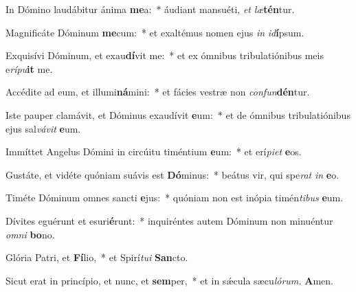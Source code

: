 \item In Dómino laudábitur ánima \textbf{me}a:~* áudiant mansuéti, \textit{et} \textit{læ}\textbf{tén}tur.
\item Magnificáte Dóminum \textbf{me}cum:~* et exaltémus nomen ejus \textit{in} \textit{id}\textbf{í}psum.
\item Exquisívi Dóminum, et exau\textbf{dí}vit me:~* et ex ómnibus tribulatiónibus meis e\textit{rípu}\textbf{it} me.
\item Accédite ad eum, et illumi\textbf{ná}mini:~* et fácies vestræ non \textit{confun}\textbf{dén}tur.
\item Iste pauper clamávit, et Dóminus exaudívit \textbf{e}um:~* et de ómnibus tribulatiónibus ejus sal\textit{vávit} \textbf{e}um.
\item Immíttet Angelus Dómini in circúitu timéntium \textbf{e}um:~* et erí\tinyhspace\textit{piet} \textbf{e}os.
\item Gustáte, et vidéte quóniam suávis est \textbf{Dó}minus:~* beátus vir, qui spe\textit{rat} \textit{in} \textbf{e}o.
\item Timéte Dóminum omnes sancti \textbf{e}jus:~* quóniam non est inópia timén\textit{tibus} \textbf{e}um.
\item Dívites eguérunt et esuri\textbf{é}runt:~* inquiréntes autem Dóminum non minuéntur \textit{omni} \textbf{bo}no.
\item Glória Patri, et \textbf{Fí}lio,~* et Spirí\tinyhspace\textit{tui} \textbf{San}cto.
\item Sicut erat in princípio, et nunc, et \textbf{sem}per,~* et in sǽcula sæcu\tinyhspace\textit{lórum.} \textbf{A}men.